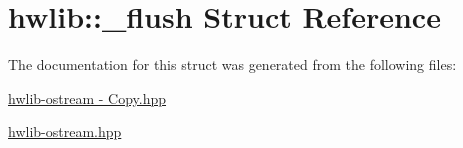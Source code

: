 \hypertarget{structhwlib_1_1__flush}{}\section{hwlib\+:\+:\+\_\+flush Struct Reference}
\label{structhwlib_1_1__flush}


The documentation for this struct was generated from the following files\+:\begin{DoxyCompactItemize}
\item 
\hyperlink{hwlib-ostream_01-_01_copy_8hpp}{hwlib-\/ostream -\/ Copy.\+hpp}\item 
\hyperlink{hwlib-ostream_8hpp}{hwlib-\/ostream.\+hpp}\end{DoxyCompactItemize}

